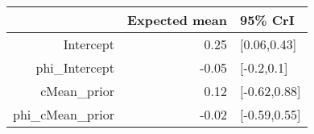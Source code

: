 \begin{tabular}{rrl}
  \hline
 & Expected mean & 95\% CrI \\ 
  \hline
Intercept & 0.25 & [0.06,0.43] \\ 
  phi\_Intercept & -0.05 & [-0.2,0.1] \\ 
  cMean\_prior & 0.12 & [-0.62,0.88] \\ 
  phi\_cMean\_prior & -0.02 & [-0.59,0.55] \\ 
   \hline
\end{tabular}

